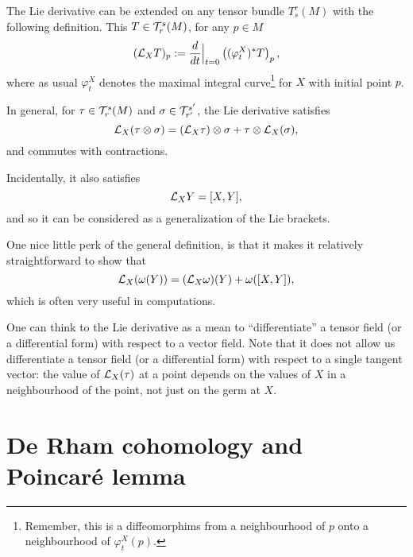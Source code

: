 \begin{remark}
  The Lie derivative can be extended on any tensor bundle $T_s^r(M)$ with the following definition.
  This $T\in\mathcal{T}_r^s(M)$, for any $p\in M$
  \begin{equation}
    (\mathcal{L}_X T)_p := \frac{d}{dt}\Big|_{t=0}\left((\varphi_t^X)^* T\right)_p,
  \end{equation}
  where as usual $\varphi_t^X$ denotes the maximal integral curve\footnote{Remember, this is a diffeomorphims from a neighbourhood of $p$ onto a neighbourhood of $\varphi_t^X(p)$.} for $X$ with initial point $p$.

  In general, for $\tau\in\mathcal{T}_r^s(M)$ and $\sigma\in\mathcal{T}_{r'}^{s'}$, the Lie derivative satisfies
  \begin{equation}
    \mathcal{L}_X(\tau\otimes\sigma) = (\mathcal{L}_X\tau)\otimes\sigma + \tau\otimes\mathcal{L}_X(\sigma),
  \end{equation}
  and commutes with contractions.

  Incidentally, it also satisfies
  \begin{equation}
    \mathcal{L}_XY = [X,Y],
  \end{equation}
  and so it can be considered as a generalization of the Lie brackets.

  One nice little perk of the general definition, is that it makes it relatively straightforward to show that
  \begin{equation}\label{eq:cLXwBrackets}
    \mathcal{L}_X(\omega(Y)) = (\mathcal{L}_X\omega)(Y) + \omega([X,Y]),
  \end{equation}
  which is often very useful in computations.

  One can think to the Lie derivative as a mean to ``differentiate'' a tensor field (or a differential form) with respect to a vector field.
  Note that it does not allow us differentiate a tensor field (or a differential form) with respect to a single tangent vector: the value of $\mathcal{L}_X(\tau)$ at a point depends on the values of $X$ in a neighbourhood of the point, not just on the germ at $X$.
\end{remark}

\section{De Rham cohomology and Poincar\'e lemma}

